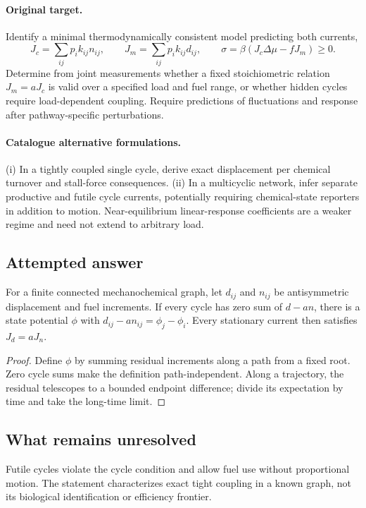 \documentclass[11pt]{article}
\begin{document}
\paragraph{Original target.}
Identify a minimal thermodynamically consistent model predicting both currents,
\[J_c=\sum_{ij}p_i k_{ij}n_{ij},\qquad J_m=\sum_{ij}p_i k_{ij}d_{ij},\qquad \sigma=\beta(J_c\Delta\mu-fJ_m)\ge0.\]
Determine from joint measurements whether a fixed stoichiometric relation $J_m=aJ_c$ is valid over a specified load and fuel range, or whether hidden cycles require load-dependent coupling. Require predictions of fluctuations and response after pathway-specific perturbations.
\paragraph{Catalogue alternative formulations.}
(i) In a tightly coupled single cycle, derive exact displacement per chemical turnover and stall-force consequences. (ii) In a multicyclic network, infer separate productive and futile cycle currents, potentially requiring chemical-state reporters in addition to motion. Near-equilibrium linear-response coefficients are a weaker regime and need not extend to arbitrary load.
\subsection{Attempted answer}
\begin{proposition}
For a finite connected mechanochemical graph, let $d_{ij}$ and $n_{ij}$ be antisymmetric displacement and fuel increments. If every cycle has zero sum of $d-an$, there is a state potential $\phi$ with $d_{ij}-an_{ij}=\phi_j-\phi_i$. Every stationary current then satisfies $J_d=aJ_n$.
\end{proposition}
\begin{proof}
Define $\phi$ by summing residual increments along a path from a fixed root. Zero cycle sums make the definition path-independent. Along a trajectory, the residual telescopes to a bounded endpoint difference; divide its expectation by time and take the long-time limit.
\end{proof}
\subsection{What remains unresolved}
Futile cycles violate the cycle condition and allow fuel use without proportional motion. The statement characterizes exact tight coupling in a known graph, not its biological identification or efficiency frontier.
\end{document}
